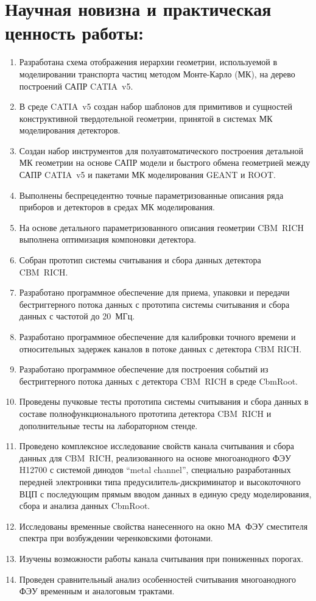 \section*{Научная новизна и практическая ценность работы:}

\begin{enumerate}
\item Разработана схема отображения иерархии геометрии, используемой в моделировании транспорта частиц методом Монте-Карло (МК), на дерево построений САПР CATIA~v5.
\item В среде CATIA~v5 создан набор шаблонов для примитивов и сущностей конструктивной твердотельной геометрии, принятой в системах МК моделирования детекторов.
\item Создан набор инструментов для полуавтоматического построения детальной МК геометрии на основе САПР модели и быстрого обмена геометрией между САПР CATIA~v5 и пакетами МК моделирования GEANT и ROOT.
\item Выполнены беспрецедентно точные параметризованные описания ряда приборов и детекторов в средах МК моделирования.
\item На основе детального параметризованного описания геометрии CBM~RICH выполнена оптимизация компоновки детектора. 
\item Собран прототип системы считывания и сбора данных детектора CBM~RICH.
\item Разработано программное обеспечение для приема, упаковки и передачи бестриггерного потока данных с прототипа системы считывания и сбора данных с частотой до 20~МГц.
\item Разработано программное обеспечение для калибровки точного времени и относительных задержек каналов в потоке данных с детектора CBM RICH.
\item Разработано программное обеспечение для построения событий из бестриггерного потока данных с детектора CBM~RICH в среде CbmRoot.
\item Проведены пучковые тесты прототипа системы считывания и сбора данных в составе полнофункционального прототипа детектора CBM~RICH и дополнительные тесты на лабораторном стенде. 
\item Проведено комплексное исследование свойств канала считывания и сбора данных для CBM~RICH, реализованного на основе многоанодного ФЭУ H12700 с системой динодов ``metal channel'', специально разработанных передней электроники типа предусилитель-дискриминатор и высокоточного ВЦП с последующим прямым вводом данных в единую среду моделирования, сбора и анализа данных CbmRoot.
\item Исследованы временные свойства нанесенного на окно МА~ФЭУ сместителя спектра при возбуждении черенковскими фотонами.
\item Изучены возможности работы канала считывания при пониженных порогах.
\item Проведен сравнительный анализ особенностей считывания многоанодного ФЭУ временным и аналоговым трактами.
\end{enumerate}
